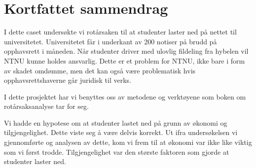 \chapter*{Kortfattet sammendrag}
I dette caset undersøkte vi rotårsaken til at studenter laster ned på nettet til universitetet. Universitetet får i underkant av 200 notiser på brudd på opphavsrett i måneden. Når studenter driver med ulovlig fildeling fra hybelen vil NTNU kunne holdes ansvarlig. Dette er et problem for NTNU, ikke bare i form av skadet omdømme, men det kan også være problematisk hvis opphavsrettshaverne går juridisk til verks. 

I dette prosjektet har vi benyttes oss av metodene og verktøyene som boken om rotårsaksanalyse \cite{RCA} tar for seg.

Vi hadde en hypotese om at studenter lastet ned på grunn av økonomi og tilgjengelighet. Dette viste seg å være delvis korrekt. Ut ifra undersøkelsen vi gjennomførte og analysen av dette, kom vi frem til at økonomi var ikke like viktig som vi først trodde. Tilgjengelighet var den største faktoren som gjorde at studenter laster ned. 
    